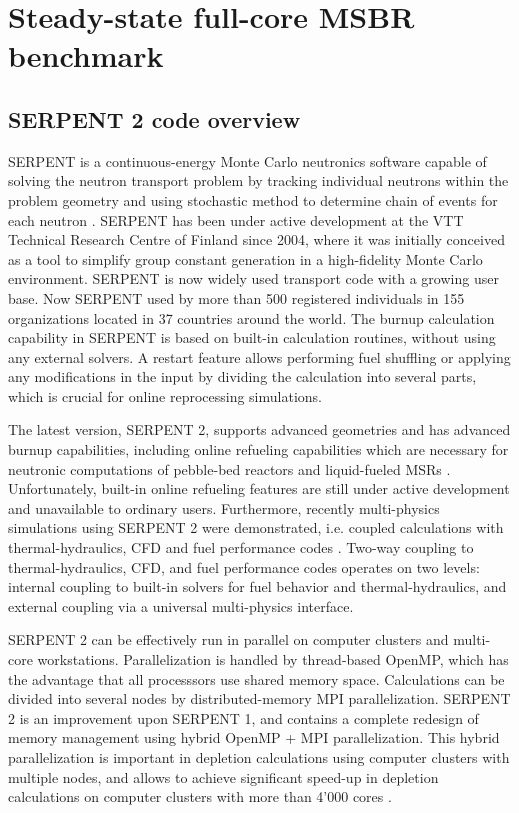 \chapter[Steady-state full-core MSBR benchmark]{Steady-state full-core MSBR benchmark}

\section{SERPENT 2 code overview}
SERPENT is a continuous-energy Monte Carlo neutronics software capable of solving the neutron transport problem by tracking individual neutrons within the problem geometry and using stochastic method to determine chain of events for each neutron \cite{leppanen_serpent_2015}. SERPENT has been under active development at the VTT Technical Research Centre of Finland since 2004, where it was initially conceived as a tool to simplify group constant generation in a high-fidelity Monte Carlo environment. SERPENT is now widely used transport code  with a growing user base. Now SERPENT used by more than 500 registered individuals in 155 organizations located in 37 countries around the world. The burnup calculation capability in SERPENT is based on built-in calculation routines, without using any external solvers. A restart feature allows performing fuel shuffling or applying any modifications in the input by dividing the calculation into several parts, which is crucial for online reprocessing simulations.

The latest version, SERPENT 2, supports advanced geometries and has advanced burnup capabilities, including online refueling capabilities which are necessary for neutronic computations of pebble-bed reactors and liquid-fueled \glspl{MSR} \cite{aufiero_extended_2013}. Unfortunately, built-in online refueling features are still under active development and unavailable to ordinary users. Furthermore, recently multi-physics simulations using SERPENT 2 were demonstrated, i.e. coupled calculations with thermal-hydraulics, \gls{CFD} and fuel performance codes \cite{leppanen_numerical_2015}. Two-way coupling to thermal-hydraulics, \gls{CFD}, and fuel performance codes operates on two levels: internal coupling to built-in solvers for fuel behavior and thermal-hydraulics, and external coupling via a universal multi-physics interface. 

SERPENT 2 can be effectively run in parallel on computer clusters and multi-core workstations. Parallelization is handled by thread-based OpenMP, which has the advantage that all processsors use shared memory space. Calculations can be divided into several nodes by distributed-memory \gls{MPI} parallelization. SERPENT 2  is an improvement upon SERPENT 1, and contains a complete redesign of memory management using hybrid OpenMP \cite{dagum_openmp:_1998} + \gls{MPI} parallelization.  This hybrid parallelization is important in depletion calculations using computer clusters with multiple nodes, and allows to achieve significant speed-up in depletion calculations on computer clusters with more than 4'000 cores \cite{leppanen_serpent_2015-1}. 

